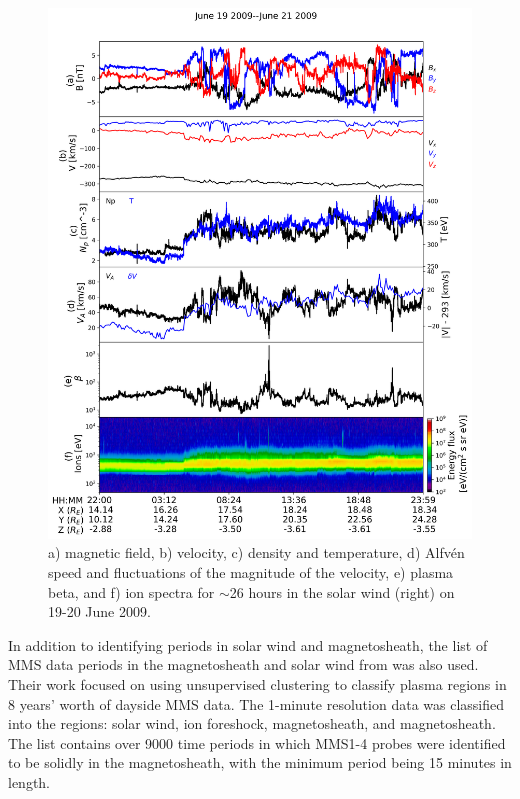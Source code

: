 \begin{figure}
    \centering
    \includegraphics[width=\textwidth]{Figures/Time series/timeseries_19062009_THMB.png}
    \caption[Time series data for THM-B on 19-20 June 2009]{a) magnetic field, b) velocity, c) density and temperature, d) Alfv\'en speed and fluctuations of the magnitude of the velocity, e) plasma beta, and f) ion spectra for $\sim$26 hours in the solar wind (right) on 19-20 June 2009.}
    \label{fig:timeseries-THM-solarwind}
\end{figure}

In addition to identifying periods in solar wind and magnetosheath, the list of MMS data periods in the magnetosheath and solar wind from \cite{ToyEdens:2024} was also used. Their work focused on using unsupervised clustering to classify plasma regions in 8 years' worth of dayside MMS data. The 1-minute resolution data was classified into the regions: solar wind, ion foreshock, magnetosheath, and magnetosheath. The \cite{ToyEdens:2024} list contains over 9000 time periods in which MMS1-4 probes were identified to be solidly in the magnetosheath, with the minimum period being 15 minutes in length. 

